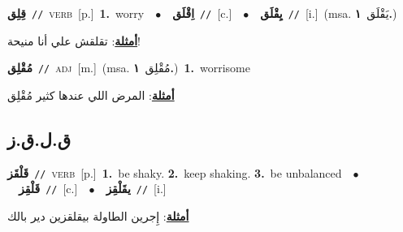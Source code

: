 \documentclass[10pt,a4paper,twoside]{article} %
\begin{document}
\begin{multicols}{2}
{\setlength\topsep{0pt}\textbf{\foreignlanguage{arabic}{قِلِق}}\ {\color{gray}\texttt{//}\color{black}}\ \textsc{verb}\ [p.]\ \textbf{1.}~worry\ \ $\bullet$\ \ \setlength\topsep{0pt}\textbf{\foreignlanguage{arabic}{اِقْلَق}}\ {\color{gray}\texttt{//}\color{black}}\ [c.]\ \ $\bullet$\ \ \setlength\topsep{0pt}\textbf{\foreignlanguage{arabic}{يِقْلَق}}\ {\color{gray}\texttt{//}\color{black}}\ [i.]\ \color{gray}(msa. \foreignlanguage{arabic}{يَقْلَق}~\foreignlanguage{arabic}{\textbf{١.}})\color{black}\  \begin{flushright}\color{gray}\foreignlanguage{arabic}{\textbf{\underline{\foreignlanguage{arabic}{أمثلة}}}: تقلقش علي أنا منيحة!}\end{flushright}\color{black}} \vspace{2mm}

{\setlength\topsep{0pt}\textbf{\foreignlanguage{arabic}{مُقْلِق}}\ {\color{gray}\texttt{//}\color{black}}\ \textsc{adj}\ [m.]\ \color{gray}(msa. \foreignlanguage{arabic}{مُقْلِق}~\foreignlanguage{arabic}{\textbf{١.}})\color{black}\ \textbf{1.}~worrisome\  \begin{flushright}\color{gray}\foreignlanguage{arabic}{\textbf{\underline{\foreignlanguage{arabic}{أمثلة}}}: المرض اللي عندها كثير مُقْلِق}\end{flushright}\color{black}} \vspace{2mm}

\vspace{-3mm}
\subsection*{\color{blue}\foreignlanguage{arabic}{ق.ل.ق.ز}\color{blue}{}} 

{\setlength\topsep{0pt}\textbf{\foreignlanguage{arabic}{قَلْقَز}}\ {\color{gray}\texttt{//}\color{black}}\ \textsc{verb}\ [p.]\ \textbf{1.}~be shaky.  \textbf{2.}~keep shaking.  \textbf{3.}~be unbalanced\ \ $\bullet$\ \ \setlength\topsep{0pt}\textbf{\foreignlanguage{arabic}{قَلْقِز}}\ {\color{gray}\texttt{//}\color{black}}\ [c.]\ \ $\bullet$\ \ \setlength\topsep{0pt}\textbf{\foreignlanguage{arabic}{يقَلْقِز}}\ {\color{gray}\texttt{//}\color{black}}\ [i.]\  \begin{flushright}\color{gray}\foreignlanguage{arabic}{\textbf{\underline{\foreignlanguage{arabic}{أمثلة}}}: إِجرين الطاولة بيقلقزين دير بالك}\end{flushright}\color{black}} \vspace{2mm}


\end{multicols}
\end{document}
